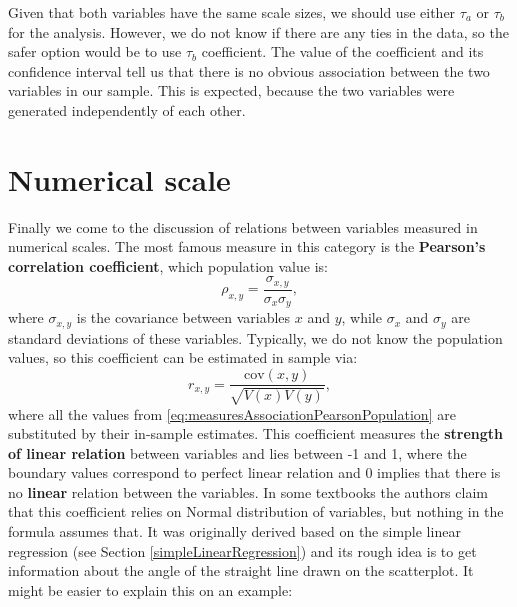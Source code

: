 \documentclass[
]{book}
\newenvironment{Shaded}{\begin{snugshade}}{\end{snugshade}}
\newcommand{\AttributeTok}[1]{\textcolor[rgb]{0.77,0.63,0.00}{#1}}
\newcommand{\FunctionTok}[1]{\textcolor[rgb]{0.00,0.00,0.00}{#1}}
\newcommand{\NormalTok}[1]{#1}
\newcommand{\SpecialCharTok}[1]{\textcolor[rgb]{0.00,0.00,0.00}{#1}}
\newcommand{\StringTok}[1]{\textcolor[rgb]{0.31,0.60,0.02}{#1}}
\theoremstyle{definition}
\theoremstyle{definition}
\theoremstyle{definition}
\theoremstyle{definition}
\theoremstyle{remark}
\begin{document}
Given that both variables have the same scale sizes, we should use either \(\tau_a\) or \(\tau_b\) for the analysis. However, we do not know if there are any ties in the data, so the safer option would be to use \(\tau_b\) coefficient. The value of the coefficient and its confidence interval tell us that there is no obvious association between the two variables in our sample. This is expected, because the two variables were generated independently of each other.

\hypertarget{correlationCoefficient}{%
\section{Numerical scale}\label{correlationCoefficient}}

Finally we come to the discussion of relations between variables measured in numerical scales. The most famous measure in this category is the \textbf{Pearson's correlation coefficient}, which population value is:
\begin{equation}
    \rho_{x,y} = \frac{\sigma_{x,y}}{\sigma_x \sigma_y},
    \label{eq:measuresAssociationPearsonPopulation}
\end{equation}
where \(\sigma_{x,y}\) is the covariance between variables \(x\) and \(y\), while \(\sigma_x\) and \(\sigma_y\) are standard deviations of these variables. Typically, we do not know the population values, so this coefficient can be estimated in sample via:
\begin{equation}
    r_{x,y} = \frac{\mathrm{cov}(x,y)}{\sqrt{V(x)V(y)}},
    \label{eq:measuresAssociationPearson}
\end{equation}
where all the values from \eqref{eq:measuresAssociationPearsonPopulation} are substituted by their in-sample estimates. This coefficient measures the \textbf{strength of linear relation} between variables and lies between -1 and 1, where the boundary values correspond to perfect linear relation and 0 implies that there is no \textbf{linear} relation between the variables. In some textbooks the authors claim that this coefficient relies on Normal distribution of variables, but nothing in the formula assumes that. It was originally derived based on the simple linear regression (see Section \ref{simpleLinearRegression}) and its rough idea is to get information about the angle of the straight line drawn on the scatterplot. It might be easier to explain this on an example:

\begin{Shaded}
\end{Shaded}
\end{document}
